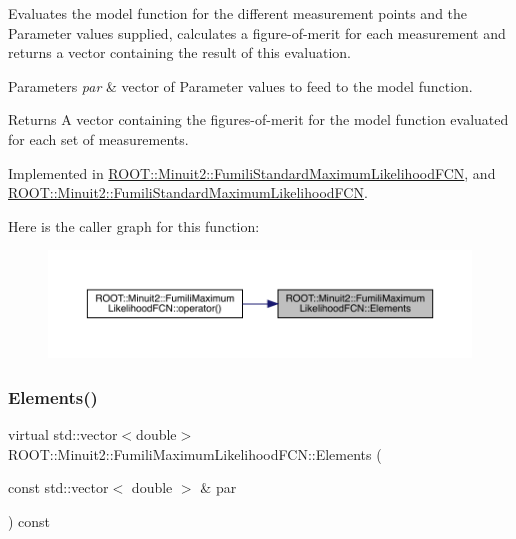 Evaluates the model function for the different measurement points and the Parameter values supplied, calculates a figure-\/of-\/merit for each measurement and returns a vector containing the result of this evaluation.


\begin{DoxyParams}{Parameters}
{\em par} & vector of Parameter values to feed to the model function.\\
\hline
\end{DoxyParams}
\begin{DoxyReturn}{Returns}
A vector containing the figures-\/of-\/merit for the model function evaluated for each set of measurements. 
\end{DoxyReturn}


Implemented in \mbox{\hyperlink{classROOT_1_1Minuit2_1_1FumiliStandardMaximumLikelihoodFCN_a19866fac44787dee8e2a6a35e7a15fe1}{R\+O\+O\+T\+::\+Minuit2\+::\+Fumili\+Standard\+Maximum\+Likelihood\+F\+CN}}, and \mbox{\hyperlink{classROOT_1_1Minuit2_1_1FumiliStandardMaximumLikelihoodFCN_af104474f9095c245b467f9db554a126a}{R\+O\+O\+T\+::\+Minuit2\+::\+Fumili\+Standard\+Maximum\+Likelihood\+F\+CN}}.

Here is the caller graph for this function\+:\nopagebreak
\begin{figure}[H]
\begin{center}
\leavevmode
\includegraphics[width=350pt]{dd/d54/classROOT_1_1Minuit2_1_1FumiliMaximumLikelihoodFCN_a20aa81dc23ba61ed49ba78f4f9627e59_icgraph}
\end{center}
\end{figure}
\mbox{\label{classROOT_1_1Minuit2_1_1FumiliMaximumLikelihoodFCN_a20aa81dc23ba61ed49ba78f4f9627e59}} 
\subsubsection{\texorpdfstring{Elements()}{Elements()}\hspace{0.1cm}{\footnotesize\ttfamily [2/2]}}
{\footnotesize\ttfamily virtual std\+::vector$<$double$>$ R\+O\+O\+T\+::\+Minuit2\+::\+Fumili\+Maximum\+Likelihood\+F\+C\+N\+::\+Elements (\begin{DoxyParamCaption}\item[{const std\+::vector$<$ double $>$ \&}]{par }\end{DoxyParamCaption}) const\hspace{0.3cm}{\ttfamily [pure virtual]}}


